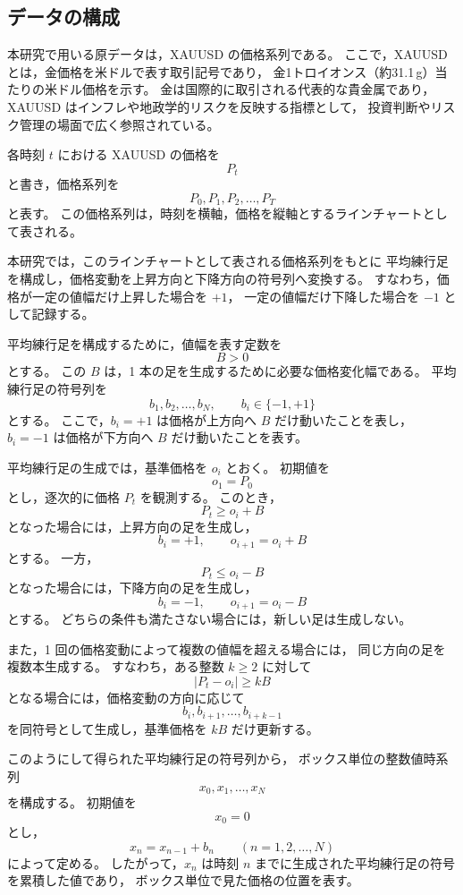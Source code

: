 \documentclass[a4j,dvipdfmx]{jsarticle}
\theoremstyle{plainnote}
\begin{document}
\subsection{データの構成}

本研究で用いる原データは，XAUUSD の価格系列である。
ここで，XAUUSD とは，金価格を米ドルで表す取引記号であり，
金1トロイオンス（約31.1\,g）当たりの米ドル価格を示す。
金は国際的に取引される代表的な貴金属であり，
XAUUSD はインフレや地政学的リスクを反映する指標として，
投資判断やリスク管理の場面で広く参照されている。

各時刻 $t$ における XAUUSD の価格を
\[
  P_t
\]
と書き，価格系列を
\[
  P_0,P_1,P_2,\ldots,P_T
\]
と表す。
この価格系列は，時刻を横軸，価格を縦軸とするラインチャートとして表される。

本研究では，このラインチャートとして表される価格系列をもとに
平均練行足を構成し，価格変動を上昇方向と下降方向の符号列へ変換する。
すなわち，価格が一定の値幅だけ上昇した場合を $+1$，
一定の値幅だけ下降した場合を $-1$ として記録する。

平均練行足を構成するために，値幅を表す定数を
\[
  B>0
\]
とする。
この $B$ は，1 本の足を生成するために必要な価格変化幅である。
平均練行足の符号列を
\[
  b_1,b_2,\ldots,b_N,
  \qquad b_i\in\{-1,+1\}
\]
とする。
ここで，$b_i=+1$ は価格が上方向へ $B$ だけ動いたことを表し，
$b_i=-1$ は価格が下方向へ $B$ だけ動いたことを表す。

平均練行足の生成では，基準価格を $o_i$ とおく。
初期値を
\[
  o_1=P_0
\]
とし，逐次的に価格 $P_t$ を観測する。
このとき，
\[
  P_t \geq o_i+B
\]
となった場合には，上昇方向の足を生成し，
\[
  b_i=+1,\qquad o_{i+1}=o_i+B
\]
とする。
一方，
\[
  P_t \leq o_i-B
\]
となった場合には，下降方向の足を生成し，
\[
  b_i=-1,\qquad o_{i+1}=o_i-B
\]
とする。
どちらの条件も満たさない場合には，新しい足は生成しない。

また，1 回の価格変動によって複数の値幅を超える場合には，
同じ方向の足を複数本生成する。
すなわち，ある整数 $k\geq2$ に対して
\[
  |P_t-o_i|\geq kB
\]
となる場合には，価格変動の方向に応じて
\[
  b_i,b_{i+1},\ldots,b_{i+k-1}
\]
を同符号として生成し，基準価格を $kB$ だけ更新する。

このようにして得られた平均練行足の符号列から，
ボックス単位の整数値時系列
\[
  x_0,x_1,\ldots,x_N
\]
を構成する。
初期値を
\begin{equation}
  x_0=0
  \label{eq:analysis_x0}
\end{equation}
とし，
\begin{equation}
  x_n=x_{n-1}+b_n
  \qquad (n=1,2,\ldots,N)
  \label{eq:analysis_xn}
\end{equation}
によって定める。
したがって，$x_n$ は時刻 $n$ までに生成された平均練行足の符号を累積した値であり，
ボックス単位で見た価格の位置を表す。
\end{document}

